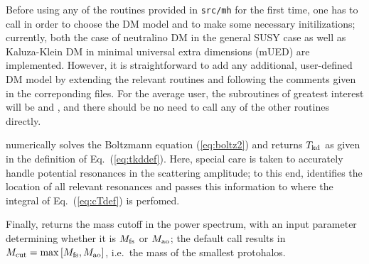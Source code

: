 Before using any of the routines provided in {\tt src/mh} for the first time, one has to 
call  in order to choose the DM model and to make some necessary initilizations; 
currently, both the case of neutralino DM in the general SUSY case as well as Kaluza-Klein DM 
in minimal universal extra 
dimensions (mUED) are implemented. However, it is straightforward to add any additional, 
user-defined  DM model by extending the relevant routines and following the comments
given in the correponding files.  
For the average user, the subroutines of greatest interest will be  and 
, and there should be no need to call any of the other routines directly.

 numerically solves the Boltzmann equation (\ref{eq:boltz2}) and returns
$T_{\rm kd}$ as given in the definition of Eq.~(\ref{eq:tkddef}). Here, special care is taken to 
accurately handle potential resonances in the scattering amplitude; to this end, 
 identifies the location of all relevant resonances and passes this
information to  where the integral of Eq.~(\ref{eq:cTdef}) is perfomed.

Finally,  returns the mass cutoff in the power spectrum, with an input parameter 
determining whether it is $M_{\rm fs}$ or $M_{\rm ao}$; the default call results in 
$M_{\rm cut}=\max\left[M_{\rm fs},M_{\rm ao}\right]$, i.e.~the mass of 
the smallest protohalos.
